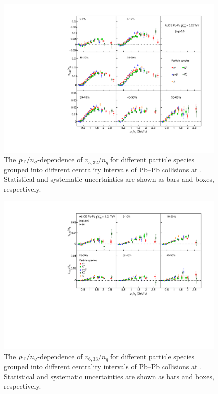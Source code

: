 \begin{figure}[!htb]
\begin{center}
\includegraphics[scale=0.82]{figures/scaling/All_v523_gap00_NCQ_3by3.pdf}
\end{center}
\caption{The $p_{\rm{T}}/n_{q}$-dependence of $v_{5,32}/n_{q}$ for different particle species grouped into different centrality intervals of Pb--Pb collisions at \sNN. Statistical and systematic uncertainties are shown as bars and boxes, respectively.}
\label{v523_NCQ}
\end{figure}

\begin{figure}[!htb]
\begin{center}
\includegraphics[scale=0.82]{figures/scaling/All_v633_gap00_NCQ_3by2.pdf}
\end{center}
\caption{The $p_{\rm{T}}/n_{q}$-dependence of $v_{6,33}/n_{q}$ for different particle species grouped into different centrality intervals of Pb--Pb collisions at \sNN. Statistical and systematic uncertainties are shown as bars and boxes, respectively.}
\label{v633_NCQ}
\end{figure}

